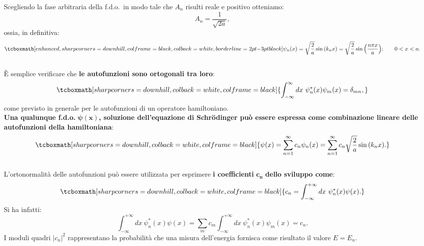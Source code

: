 Scegliendo la fase arbitraria della f.d.o.~in modo tale che $A_n$ risulti reale e positivo otteniamo:
	\begin{equation}
		A_n = \frac{1}{\sqrt{2a}},
	\end{equation}
ossia, in definitiva:
	\begin{equation}
		\tcboxmath[enhanced, sharp corners=downhill, colframe=black, colback=white, borderline={2pt}{-3pt}{black}]{
			\psi _n (x)= \sqrt{\frac{2}{a}} \sin{\left( k_n x\right)} = \sqrt{\frac{2}{a}} \sin{\left( \frac{n \pi x}{a}\right)};
			} \qquad 0<x<a.
\end{equation}\\

È semplice verificare che \textbf{le autofunzioni sono ortogonali tra loro}:
	\begin{equation}
		\tcboxmath[sharp corners=downhill, colback=white, colframe=black]{
			\int _{-\infty} ^{\infty} dx\ \psi_n ^* (x) \psi _m (x) = \delta _{mn},
			}
	\end{equation}
come previsto in generale per le autofunzioni di un operatore hamiltoniano.\\ 

\textbf{Una qualunque f.d.o.} $\mathbf{\psi (x)}$\textbf{, soluzione dell'equazione di Schr\"{o}dinger può essere espressa come combinazione lineare delle autofunzioni della hamiltoniana}:
	\begin{equation}
		\tcboxmath[sharp corners=downhill, colback=white, colframe=black]{
			\psi (x) = \sum _{n=1} ^{\infty} c_n \psi _n (x) = \sum _{n=1} ^{\infty} c_n \sqrt{\frac{2}{a}} \sin {\left( k_n x \right)}.
			}
	\end{equation}\\
	
L'ortonormalità delle autofunzioni può essere utilizzata per esprimere \textbf{i coefficienti} $\mathbf{c_n}$ \textbf{dello sviluppo come}:
	\begin{equation}
		\tcboxmath[sharp corners=downhill, colback=white, colframe=black]{
			c_n = \int _{-\infty} ^{+\infty} dx\ \psi _n ^* (x) \psi(x).
			}
	\end{equation}
Si ha infatti:
\begin{equation}
\int _{-\infty} ^{+\infty} dx\ \psi _n ^* (x) \psi(x)= \sum _m c_m \int _{-\infty} ^{+\infty} dx\ \psi _n ^* (x) \psi _m(x)= c_n.
\end{equation}
I moduli quadri $|c_n|^2$ rappresentano la probabilità che una misura dell'energia fornisca come risultato il valore $E=E_n$.\\

